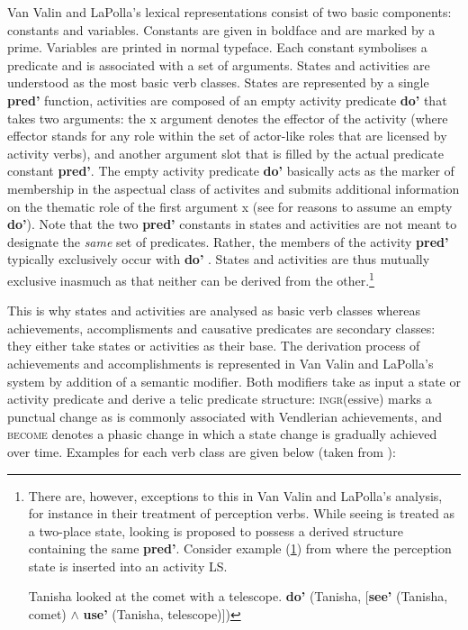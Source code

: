 \largerpage[1]
Van Valin and LaPolla's lexical representations consist of two basic components: constants and variables. Constants are given in boldface and are marked by a prime. Variables are printed in normal typeface. Each constant symbolises a predicate and is associated with a set of arguments. States and activities are understood as the most basic verb classes. States are represented by a single \textbf{pred'} function, activities are composed of an empty activity predicate \textbf{do'} that takes two arguments: the x argument denotes the effector of the activity (where effector stands for any role within the set of actor-like roles that are licensed by activity verbs), and another argument slot that is filled by the actual predicate constant \textbf{pred'}. The empty activity predicate \textbf{do'} basically acts as the marker of membership in the aspectual class of activites and submits additional information on the thematic role of the first argument x (see \citealt[103f.]{van1997syntax} for reasons to assume an empty \textbf{do'}). Note that the two \textbf{pred'} constants in states and activities are not meant to designate the \emph{same} set of predicates. Rather, the members of the activity \textbf{pred'} typically exclusively occur with \textbf{do'} \citep[103]{van1997syntax}. States and activities are thus mutually exclusive inasmuch as that neither can be derived from the other.\footnote{There are, however, exceptions to this in Van Valin and LaPolla's analysis, for instance in their treatment of perception verbs. While seeing is treated as a two-place state, looking is proposed to possess a derived structure containing the same \textbf{pred'}. Consider example (\ref{look}) from \citet[121]{van1997syntax} where the perception state is inserted into an activity LS.

\ea \label{look}
\ea Tanisha looked at the comet with a telescope.
\ex \textbf{do'} (Tanisha, [\textbf{see'} (Tanisha, comet) $\wedge$ \textbf{use'} (Tanisha, telescope)])
\z\z

}

This is why states and activities are analysed as basic verb classes whereas achievements, accomplisments and causative predicates are secondary classes: they either take states or activities as their base. The derivation process of achievements and accomplishments is represented in Van Valin and LaPolla's system by addition of a semantic modifier. Both modifiers take as input a state or activity predicate and derive a telic predicate structure: \textsc{ingr}(essive) marks a punctual change as is commonly associated with Vendlerian achievements, and \textsc{become} denotes a phasic change in which a state change is gradually achieved over time. Examples for each verb class are given below (taken from \citealt[105]{van1997syntax}):

